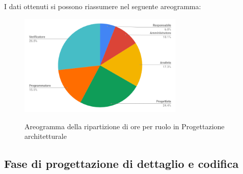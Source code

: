 \pagebreak
I dati ottenuti si possono riassumere nel seguente areogramma:
\begin{figure}[H] 
			\centering 
				\includegraphics[width=0.7\textwidth]{res/images/areogramma_architetturale.png}\\
				\caption{Areogramma della ripartizione di ore per ruolo in Progettazione architetturale}
			\label{AreogrammaArchitetturale}
\end{figure}

\subsection{Fase di progettazione di dettaglio e codifica}
